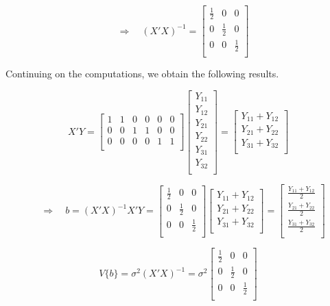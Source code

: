 \documentclass[
]{book}
\begin{document}
\[ 
\quad \Rightarrow \quad \left(X'X\right)^{-1}=
\begin{bmatrix}
\frac{1}{2} & 0 & 0 \\ 0 & \frac{1}{2} & 0 \\ 0 & 0 & \frac{1}{2} \\ \end{bmatrix}
\]

Continuing on the computations, we obtain the following results.

\[ 
X'Y = 
\begin{bmatrix}
1 & 1 & 0 & 0 & 0 & 0 \\
0 & 0 & 1 & 1 & 0 & 0 \\
0 & 0 & 0 & 0 & 1 & 1 \\ \end{bmatrix}
\begin{bmatrix}
Y_{11} \\ Y_{12} \\ Y_{21} \\ Y_{22} \\
Y_{31} \\ Y_{32} \\ \end{bmatrix}
=
\begin{bmatrix}
Y_{11}+Y_{12} \\ Y_{21}+Y_{22} \\ Y_{31}+Y_{32}\\ \end{bmatrix}
\]

\[
\quad \Rightarrow \quad
b = \left(X'X\right)^{-1}X'Y = 
\begin{bmatrix}
\frac{1}{2} & 0 & 0 \\ 0 & \frac{1}{2} & 0 \\ 0 & 0 & \frac{1}{2} \\ \end{bmatrix}
\begin{bmatrix}
Y_{11}+Y_{12} \\ Y_{21}+Y_{22} \\ Y_{31}+Y_{32}\\ \end{bmatrix}
=
\begin{bmatrix}
\frac{Y_{11}+Y_{12}}{2} \\
\frac{Y_{21}+Y_{22}}{2} \\
\frac{Y_{31}+Y_{32}}{2} \\
\end{bmatrix}
\]

\[
V\{b\} = 
\sigma^2\left(X'X\right)^{-1}
=\sigma^2 \begin{bmatrix}
\frac{1}{2} & 0 & 0 \\ 0 & \frac{1}{2} & 0 \\ 0 & 0 & \frac{1}{2} \\ \end{bmatrix}
\]
\end{document}
